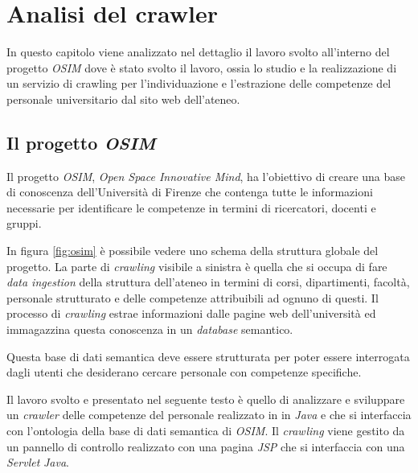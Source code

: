 \documentclass[tesi.tex]{subfiles}
\begin{document}
\chapter{Analisi del crawler}
In questo capitolo viene analizzato nel dettaglio il lavoro svolto all'interno del
progetto \emph{OSIM} dove \`e stato svolto il lavoro, ossia lo studio
e la realizzazione di un servizio di crawling per l'individuazione e
l'estrazione delle competenze del personale universitario dal sito web
dell'ateneo.

\section{Il progetto \emph{OSIM}}
Il progetto \emph{OSIM}, \emph{Open Space Innovative Mind}, ha
l'obiettivo di creare una base di conoscenza dell'Universit\`a di
Firenze che contenga tutte le informazioni necessarie per identificare
le competenze in termini di ricercatori, docenti e gruppi.

In figura \ref{fig:osim} \`e possibile vedere uno schema della
struttura globale del progetto.
La parte di \emph{crawling} visibile a sinistra \`e quella che si
occupa di fare \emph{data ingestion} della struttura dell'ateneo in
termini di corsi, dipartimenti, facolt\`a, personale strutturato e
delle competenze attribuibili ad ognuno di questi. Il processo di \emph{crawling} estrae informazioni dalle pagine
web dell'universit\`a ed immagazzina questa conoscenza in un
\emph{database} semantico.

Questa base di dati semantica deve essere strutturata per poter essere
interrogata dagli utenti che desiderano cercare personale con
competenze specifiche.

Il lavoro svolto e presentato nel seguente testo \`e quello di
analizzare e sviluppare un \emph{crawler} delle competenze del
personale realizzato in  in \emph{Java} e che si interfaccia con
l'ontologia della base di dati semantica di \emph{OSIM}. Il
\emph{crawling} viene gestito da un pannello di controllo realizzato
con una pagina \emph{JSP} che si interfaccia con una \emph{Servlet}
\emph{Java}.
\end{document}
